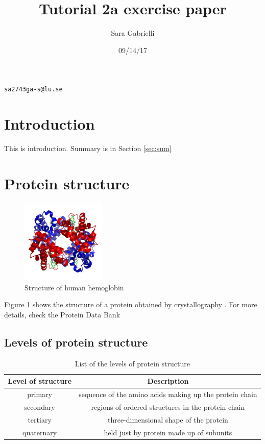 \documentclass[a4paper,12pt,twoside]{article}
\author{Sara Gabrielli}
\title{Tutorial 2a exercise paper}
\date{09/14/17}
\begin{document}
 \maketitle
 
 \begin{center}
  \texttt{sa2743ga-s@lu.se}
 \end{center}

 \section{Introduction}
\label{sec:intro}

This is introduction. Summary is in Section \ref{sec:sum}

 \section{Protein structure}
\label{sec:prot struc}

\begin{figure}[h]
\begin{center}
\includegraphics[width=4cm]{Haemo.png}
\caption{Structure of human hemoglobin}
\label{fig:hemo}
\end{center}
\end{figure}

Figure \ref{fig:hemo} shows the structure of a protein obtained by crystallography . For more details, check the Protein Data Bank~\cite{PDB}

\subsection{Levels of protein structure}
\label{sec:levels}

\begin{table}[h]
 \begin{center}
 \caption{List of the levels of protein structure}
 \label{types}
  \begin{tabular}{c|c} 
  \textbf{Level of structure}& \textbf{Description}\\ \hline \hline
  primary& sequence of the amino acids making up the protein chain\\ \hline
  secondary& regions of ordered structures in the protein chain \\ \hline
  tertiary& three-dimensional shape of the protein\\ \hline
  quaternary& held just by protein made up of subunits\\ \hline
  \end{tabular}

 \end{center}

\end{table}
\end{document}
